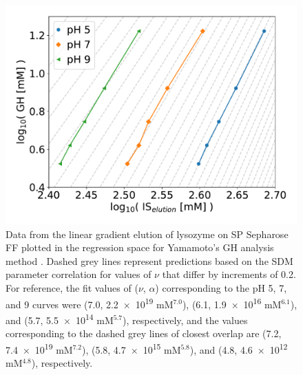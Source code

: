 \documentclass[11pt,a4paper]{article}
\begin{document}
\begin{figure}[htbp]
    \centering
    \includegraphics[width=\textwidth]{figure_8}
    \caption{
    Data from the linear gradient elution of lysozyme on SP Sepharose FF plotted in the regression space for Yamamoto's GH analysis method \cite{main-Yamamoto1987}. Dashed grey lines represent predictions based on the SDM parameter correlation for values of $\nu$ that differ by increments of 0.2. For reference, the fit values of ($\nu$, $\alpha$) corresponding to the pH 5, 7, and 9 curves were (7.0, \num{2.2e+19} mM$^{7.0}$), (6.1, \num{1.9e+16} mM$^{6.1}$), and (5.7, \num{5.5e+14} mM$^{5.7}$), respectively, and the values corresponding to the dashed grey lines of closest overlap are (7.2, \num{7.4e19} mM$^{7.2}$), (5.8, \num{4.7e15} mM$^{5.8}$), and (4.8, \num{4.6e12} mM$^{4.8}$), respectively.
    }
    \label{fig:lge overlay}
\end{figure}
\end{document}
